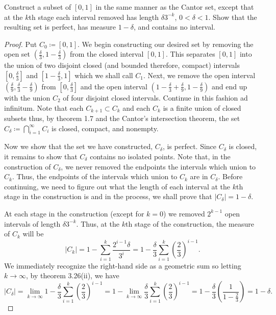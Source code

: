 \begin{problem}
Construct a subset of $[0,1]$ in the same manner as the Cantor set, except
that at the $k$th stage each interval removed has length $\delta 3^{-k}$,
$0<\delta<1$. Show that the resulting set is perfect, has measure
$1-\delta$, and contains no interval.
\end{problem}
\begin{proof}
Put $C_0\coloneqq[0,1]$. We begin constructing our desired set by
removing the open set $\left(\frac{\delta}{3},1-\frac{\delta}{3}\right)$
from the closed interval $[0,1]$. This separates $[0,1]$ into the union of
two disjoint closed (and bounded therefore, compact) intervals
$\left[0,\tfrac{\delta}{3}\right]$ and $\left[1-\tfrac{\delta}{3},1\right]$
which we shall call $C_1$. Next, we remove the open
interval $\left(\tfrac{\delta}{9},\frac{\delta}{3}-\frac{\delta}{9}\right)$
from $\left[0,\tfrac{\delta}{3}\right]$ and the open interval
$\left(1-\tfrac{\delta}{3}+\tfrac{\delta}{9},1-\tfrac{\delta}{9}\right)$
and end up with the union $C_2$ of four disjoint closed intervals. Continue
in this fashion ad infinitum. Note that each $C_{k+1}\subset C_k$ and each
$C_k$ is a finite union of closed subsets thus, by theorem 1.7 and the
Cantor's intersection theorem, the set
$C_\delta\coloneqq\bigcap_{i=1}^\infty C_i$ is closed, compact, and nonempty.

Now we show that the set we have constructed, $C_\delta$, is perfect. Since
$C_\delta$ is closed, it remains to show that $C_\delta$ contains no
isolated points. Note that, in the construction of $C_\delta$, we never
removed the endpoints the intervals which union to $C_k$. Thus, the
endpoints of the intervals which union to $C_k$ are in $C_\delta$. Before
continuing, we need to figure out what the length of each interval at the
$k$th stage in the construction is and in the process, we shall prove that
$\left|C_\delta\right|=1-\delta$.

At each stage in the construction (except for $k=0$) we removed $2^{k-1}$
open intervals of length $\delta 3^{-k}$. Thus, at the $k$th stage of the
construction, the measure of $C_k$ will be
\[
\left|C_k\right|
=1-\sum_{i=1}^k\frac{2^{i-1}\delta}{3^i}=
1-\frac{\delta}{3}\sum_{i=1}^k\left(\frac{2}{3}\right)^{i-1}.
\]
We immediately recognize the right-hand side as a geometric sum so letting
$k\to\infty$, by theorem 3.26(ii), we have
\[
\left|C_\delta\right|
=\lim_{k\to\infty}1-\frac{\delta}{3}\sum_{i=1}^k\left(\frac{2}{3}\right)^{i-1}
=1-\lim_{k\to\infty}\frac{\delta}{3}\sum_{i=1}^k\left(\frac{2}{3}\right)^{i-1}
=1-\frac{\delta}{3}\left(\frac{1}{1-\frac{2}{3}}\right)=1-\delta.
\]


\end{proof}
